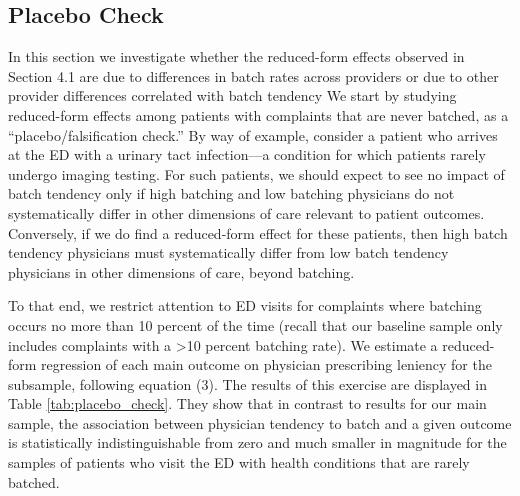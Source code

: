\documentclass[,,nonblindrev]{informs}
\begin{document}
\hypertarget{placebo-check}{%
\subsection{Placebo Check}\label{placebo-check}}

In this section we investigate whether the reduced-form effects observed
in Section 4.1 are due to differences in batch rates across providers or
due to other provider differences correlated with batch tendency We
start by studying reduced-form effects among patients with complaints
that are never batched, as a ``placebo/falsification check.'' By way of
example, consider a patient who arrives at the ED with a urinary tact
infection---a condition for which patients rarely undergo imaging
testing. For such patients, we should expect to see no impact of batch
tendency only if high batching and low batching physicians do not
systematically differ in other dimensions of care relevant to patient
outcomes. Conversely, if we do find a reduced-form effect for these
patients, then high batch tendency physicians must systematically differ
from low batch tendency physicians in other dimensions of care, beyond
batching.

To that end, we restrict attention to ED visits for complaints where
batching occurs no more than 10 percent of the time (recall that our
baseline sample only includes complaints with a \textgreater10 percent
batching rate). We estimate a reduced-form regression of each main
outcome on physician prescribing leniency for the subsample, following
equation (3). The results of this exercise are displayed in Table
\ref{tab:placebo_check}. They show that in contrast to results for our
main sample, the association between physician tendency to batch and a
given outcome is statistically indistinguishable from zero and much
smaller in magnitude for the samples of patients who visit the ED with
health conditions that are rarely batched.
\end{document}
